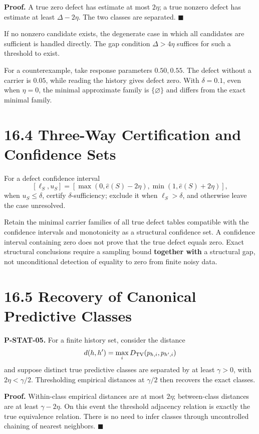 \documentclass[
  english,
  11pt,
  oneside]{book}
\begin{document}
\textbf{Proof.} A true zero defect has estimate at most \(2\eta\); a true nonzero defect has estimate at least \(\Delta-2\eta\). The two classes are separated. \(\blacksquare\)

If no nonzero candidate exists, the degenerate case in which all candidates are sufficient is handled directly. The gap condition \(\Delta>4\eta\) suffices for such a threshold to exist.

For a counterexample, take response parameters \(0.50,0.55\). The defect without a carrier is \(0.05\), while reading the history gives defect zero. With \(\delta=0.1\), even when \(\eta=0\), the minimal approximate family is \(\{\varnothing\}\) and differs from the exact minimal family.

\section{16.4 Three-Way Certification and Confidence Sets}\label{three-way-certification-and-confidence-sets}

For a defect confidence interval \[[\ell_S,u_S]=
[\max(0,\widehat e(S)-2\eta),\min(1,\widehat e(S)+2\eta)],\] when \(u_S\le\delta\), certify \(\delta\)-sufficiency; exclude it when \(\ell_S>\delta\), and otherwise leave the case unresolved.

Retain the minimal carrier families of all true defect tables compatible with the confidence intervals and monotonicity as a structural confidence set. A confidence interval containing zero does not prove that the true defect equals zero. Exact structural conclusions require a sampling bound \textbf{together with} a structural gap, not unconditional detection of equality to zero from finite noisy data.

\section{16.5 Recovery of Canonical Predictive Classes}\label{recovery-of-canonical-predictive-classes}

\hypertarget{p-stat-05}{}\label{p-stat-05}

\textbf{P-STAT-05.} For a finite history set, consider the distance \[d(h,h')=\max_iD_{\rm TV}(p_{h,i},p_{h',i})\] and suppose distinct true predictive classes are separated by at least \(\gamma>0\), with \(2\eta<\gamma/2\). Thresholding empirical distances at \(\gamma/2\) then recovers the exact classes.

\textbf{Proof.} Within-class empirical distances are at most \(2\eta\); between-class distances are at least \(\gamma-2\eta\). On this event the threshold adjacency relation is exactly the true equivalence relation. There is no need to infer classes through uncontrolled chaining of nearest neighbors. \(\blacksquare\)
\end{document}
